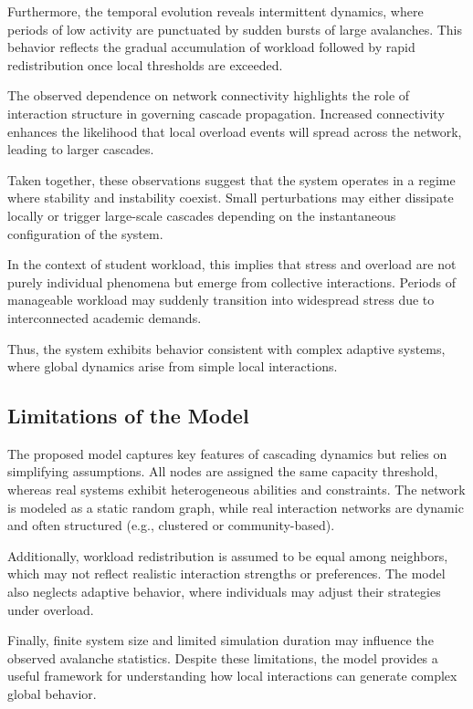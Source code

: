\documentclass[12pt]{article}
\begin{document}
Furthermore, the temporal evolution reveals intermittent dynamics, where periods of low activity are punctuated by sudden bursts of large avalanches. This behavior reflects the gradual accumulation of workload followed by rapid redistribution once local thresholds are exceeded.

The observed dependence on network connectivity highlights the role of interaction structure in governing cascade propagation. Increased connectivity enhances the likelihood that local overload events will spread across the network, leading to larger cascades.

Taken together, these observations suggest that the system operates in a regime where stability and instability coexist. Small perturbations may either dissipate locally or trigger large-scale cascades depending on the instantaneous configuration of the system.

In the context of student workload, this implies that stress and overload are not purely individual phenomena but emerge from collective interactions. Periods of manageable workload may suddenly transition into widespread stress due to interconnected academic demands.

Thus, the system exhibits behavior consistent with complex adaptive systems, where global dynamics arise from simple local interactions.
\subsection{Limitations of the Model}

The proposed model captures key features of cascading dynamics but relies on simplifying assumptions. All nodes are assigned the same capacity threshold, whereas real systems exhibit heterogeneous abilities and constraints. The network is modeled as a static random graph, while real interaction networks are dynamic and often structured (e.g., clustered or community-based).

Additionally, workload redistribution is assumed to be equal among neighbors, which may not reflect realistic interaction strengths or preferences. The model also neglects adaptive behavior, where individuals may adjust their strategies under overload.

Finally, finite system size and limited simulation duration may influence the observed avalanche statistics. Despite these limitations, the model provides a useful framework for understanding how local interactions can generate complex global behavior.
\end{document}
